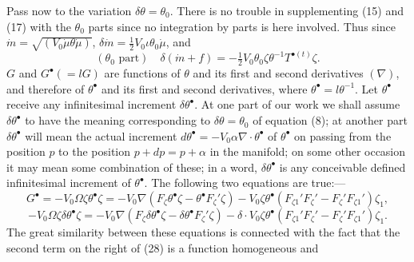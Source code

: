 \documentclass[11pt]{article}
\begin{document}
\indent Pass now to the variation $\delta\theta=\theta_0$. There is no trouble in supplementing (15) and (17) with the $\theta_0$ parts since no integration by parts is here involved. Thus since $\dot m=\sqrt{(V_0\dot\mu\theta\dot\mu)}$, $\delta\dot m=\tfrac12V_0\iota\theta_0\dot\mu$, and
\begin{equation}
  (\theta_0\text{ part})\quad\delta(\dot m+f)=-\tfrac12V_0\theta_0\zeta\theta^{-1}T^{\bullet(t)}\zeta.
  \tag{27}
\end{equation}
$G$ and $G^\bullet(=lG)$ are functions of $\theta$ and its first and second derivatives $(\nabla)$, and therefore of $\theta^\bullet$ and its first and second derivatives, where $\theta^\bullet=l\theta^{-1}$. Let $\theta^\bullet$ receive any infinitesimal increment $\delta\theta^\bullet$. At one part of our work we shall assume $\delta\theta^\bullet$ to have the meaning corresponding to $\delta\theta=\theta_0$ of equation (8); at another part $\delta\theta^\bullet$ will mean the actual increment $d\theta^\bullet=-V_0\alpha\nabla\mathbin{\cdot}\theta^\bullet$ of $\theta^\bullet$ on passing from the position $p$ to the position $p+d p=p+\alpha$ in the manifold; on some other occasion it may mean some combination of these; in a word, $\delta\theta^\bullet$ is any conceivable defined infinitesimal increment of $\theta^\bullet$. The following two equations are true:---
\[
  G^\bullet=-V_0\Omega\zeta\theta^\bullet\zeta=-V_0\nabla(F_\zeta\theta^\bullet\zeta-\theta^\bullet F_\zeta'\zeta)-V_0\zeta\theta^\bullet(F_{\zeta1}'F_{\zeta}'-F_{\zeta}'F_{\zeta1}')\zeta_1,\tag{28}
\]
\[
  -V_0\Omega\zeta\delta\theta^\bullet\zeta=-V_0\nabla(F_\zeta\delta\theta^\bullet\zeta-\delta\theta^\bullet F_\zeta'\zeta)-\delta\mathbin{\cdot}V_0\zeta\theta^\bullet(F_{\zeta1}'F_{\zeta}'-F_{\zeta}'F_{\zeta1}')\zeta_1.\tag{29}
\]
The great similarity between these equations is connected with the fact that the second term on the right of (28) is a function homogeneous and
\end{document}
